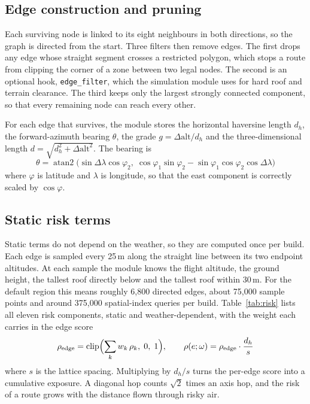 \subsection{Edge construction and pruning}

Each surviving node is linked to its eight neighbours in both directions, so the graph
is directed from the start. Three filters then remove edges. The first drops any edge
whose straight segment crosses a restricted polygon, which stops a route from clipping
the corner of a zone between two legal nodes. The second is an optional hook,
\texttt{edge\_filter}, which the simulation module uses for hard roof and terrain
clearance. The third keeps only the largest strongly connected component, so that every
remaining node can reach every other.

For each edge that survives, the module stores the horizontal haversine length $d_h$,
the forward-azimuth bearing $\theta$, the grade $g = \Delta\mathrm{alt}/d_h$ and the
three-dimensional length $d = \sqrt{d_h^2 + \Delta\mathrm{alt}^2}$. The bearing is
\begin{equation}
  \theta = \operatorname{atan2}\bigl(\sin\Delta\lambda\cos\varphi_2,\;
  \cos\varphi_1\sin\varphi_2 - \sin\varphi_1\cos\varphi_2\cos\Delta\lambda\bigr)
\end{equation}
where $\varphi$ is latitude and $\lambda$ is longitude, so that the east component is
correctly scaled by $\cos\varphi$.

\subsection{Static risk terms}

Static terms do not depend on the weather, so they are computed once per build. Each
edge is sampled every 25\,m along the straight line between its two endpoint
altitudes. At each sample the module knows the flight altitude, the ground height, the
tallest roof directly below and the tallest roof within 30\,m. For the default region
this means roughly 6,800 directed edges, about 75,000 sample points and around 375,000
spatial-index queries per build. Table~\ref{tab:risk} lists all eleven risk components,
static and weather-dependent, with the weight each carries in the edge score
\begin{equation}
  \rho_\mathrm{edge} = \operatorname{clip}\Bigl(\sum_k w_k\,\rho_k,\; 0,\; 1\Bigr),
  \qquad \rho(e;\omega) = \rho_\mathrm{edge}\cdot\frac{d_h}{s} \label{eq:risk}
\end{equation}
where $s$ is the lattice spacing. Multiplying by $d_h/s$ turns the per-edge score into
a cumulative exposure. A diagonal hop counts $\sqrt{2}$ times an axis hop, and the risk
of a route grows with the distance flown through risky air.

